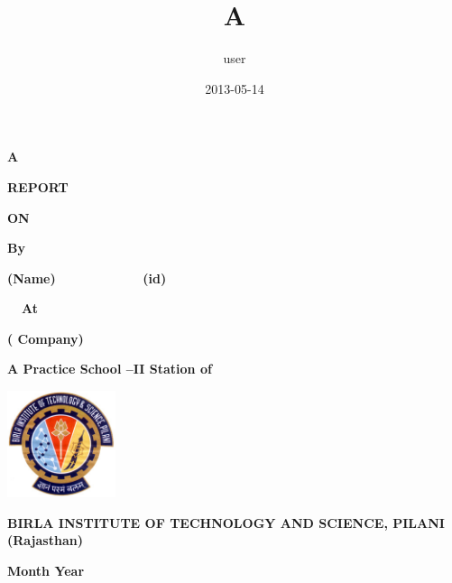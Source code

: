 \documentclass[letterpaper]{article}
\title{A}
\author{user}
\date{2013-05-14}
\begin{document}
\clearpage\setcounter{page}{1}\pagestyle{Standard}
{\centering {}\bfseries
A
\par}

{\centering{}\bfseries
REPORT
\par}

{\centering{}\bfseries
ON
\par}


\bigskip


\bigskip


\bigskip

{\centering{}\bfseries
By
\par}


\bigskip

{\centering{}\bfseries
(Name)\ \ \ \ \ \ \ \ \ \ \ \ (id)
\par}


\bigskip

{\centering{}\bfseries
\ \ At
\par}


\bigskip


\bigskip

{\centering{}\bfseries
( Company)
\par}


\bigskip

{\centering{}\bfseries
A Practice School --II Station of
\par}


\bigskip

{\centering 
\includegraphics[width=3.175cm,height=3.124cm]{formatreport-img1.jpg}
\par}


\bigskip

{\centering{}\bfseries
BIRLA INSTITUTE OF TECHNOLOGY AND SCIENCE, PILANI
(Rajasthan)
\par}


\bigskip

{\centering{}\bfseries
Month Year
\par}
\end{document}
